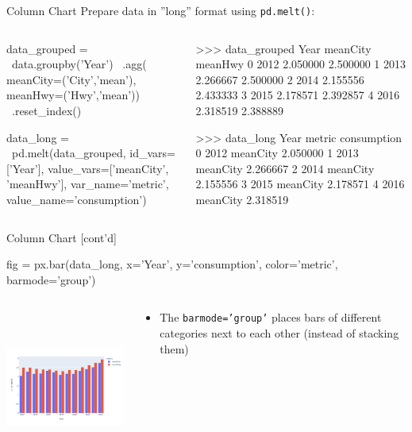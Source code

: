 \documentclass[ignorenonframetext,xcolor=x11names]{beamer}
\begin{document}
\begin{frame}[fragile]{Column Chart}
Prepare data in ''long'' format using \texttt{pd.melt()}:
\begin{columns}
\begin{column}{.55\textwidth}
\begin{pythoncode}
data_grouped = \
data.groupby('Year') \
  .agg(
     meanCity=('City','mean'),
     meanHwy=('Hwy','mean')) \
  .reset_index()

data_long = \
  pd.melt(data_grouped, 
      id_vars=['Year'], 
      value_vars=['meanCity', 
                  'meanHwy'], 
      var_name='metric', 
      value_name='consumption')
\end{pythoncode}
\end{column}
\begin{column}{.525\textwidth}
\begin{textcode}
>>> data_grouped
    Year  meanCity   meanHwy
0   2012  2.050000  2.500000
1   2013  2.266667  2.500000
2   2014  2.155556  2.433333
3   2015  2.178571  2.392857
4   2016  2.318519  2.388889
\end{textcode}
\begin{textcode}
>>> data_long
    Year    metric  consumption
0   2012  meanCity     2.050000
1   2013  meanCity     2.266667
2   2014  meanCity     2.155556
3   2015  meanCity     2.178571
4   2016  meanCity     2.318519
\end{textcode}
\end{column}
\end{columns}
\end{frame}

\begin{frame}[fragile]{Column Chart \small [cont'd]}

\begin{pythoncode}
fig = px.bar(data_long, 
   x='Year', y='consumption', color='metric', 
   barmode='group')
\end{pythoncode}
\begin{columns}
\begin{column}{.65\textwidth}
  \includegraphics[height=2in]{px.fuel.columns.pdf}
\end{column}
\begin{column}{.35\textwidth}
\footnotesize
  \begin{itemize}
  \item The \texttt{barmode='group'} places bars of different categories next to each other (instead of stacking them)
  \end{itemize}
\end{column}
\end{columns}
\end{frame}
\end{document}
